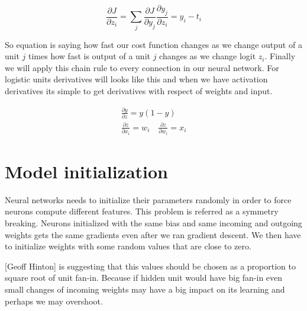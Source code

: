 \begin{equation}
\frac{\partial J}{\partial z_i} = \sum\limits_j\frac{\partial J}{\partial y_j}\frac{\partial y_j}{\partial z_i} = y_i - t_i
\end{equation}

So equation is saying how fast our cost function changes as we change output of a unit \(j\) times how fast is output of a unit \(j\) changes as we change logit \(z_i\). Finally we will apply this chain rule to every connection in our neural network. For logistic units derivatives will looks like this and when we have activation derivatives its simple to get derivatives with respect of weights and input.  

\begin{eqnarray}
\frac{\partial y}{\partial z} = y(1 - y) \\
\frac{\partial z}{\partial x_i} = w_i \quad \frac{\partial z}{\partial w_i} = x_i
\end{eqnarray}

\section{Model initialization}
Neural networks needs to initialize their parameters randomly in order to force neurons compute different features. This problem is referred as a symmetry breaking. Neurons initialized with the same bias and same incoming and outgoing weights gets the same gradients even after we ran gradient descent. We then have to initialize weights with some random values that are close to zero.

[Geoff Hinton] is suggesting that this values should be chosen as a proportion to square root of unit fan-in. Because if hidden unit would have big fan-in even small changes of incoming weights may have a big impact on its learning and perhaps we may overshoot.

